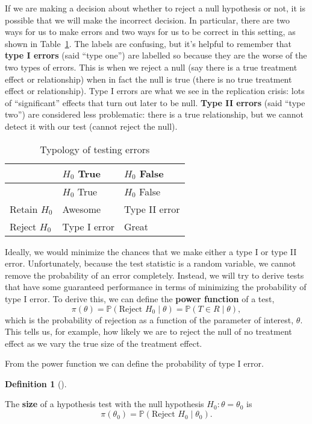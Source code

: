 \documentclass[
  letterpaper,
  DIV=11,
  numbers=noendperiod]{scrreprt}
\renewcommand{\P}{\mathbb{P}}
\theoremstyle{definition}
\newtheorem{definition}{Definition}[chapter]
\theoremstyle{plain}
\theoremstyle{definition}
\theoremstyle{remark}
\begin{document}
If we are making a decision about whether to reject a null hypothesis or
not, it is possible that we will make the incorrect decision. In
particular, there are two ways for us to make errors and two ways for us
to be correct in this setting, as shown in Table~\ref{tbl-errors}. The
labels are confusing, but it's helpful to remember that \textbf{type I
errors} (said ``type one'') are labelled so because they are the worse
of the two types of errors. This is when we reject a null (say there is
a true treatment effect or relationship) when in fact the null is true
(there is no true treatment effect or relationship). Type I errors are
what we see in the replication crisis: lots of ``significant'' effects
that turn out later to be null. \textbf{Type II errors} (said ``type
two'') are considered less problematic: there is a true relationship,
but we cannot detect it with our test (cannot reject the null).

\hypertarget{tbl-errors}{}
\begin{longtable}[]{@{}lll@{}}
\caption{\label{tbl-errors}Typology of testing errors}\tabularnewline
\toprule()
& \(H_0\) True & \(H_0\) False \\
\midrule()
\endfirsthead
\toprule()
& \(H_0\) True & \(H_0\) False \\
\midrule()
\endhead
Retain \(H_0\) & Awesome & Type II error \\
Reject \(H_0\) & Type I error & Great \\
\bottomrule()
\end{longtable}

Ideally, we would minimize the chances that we make either a type I or
type II error. Unfortunately, because the test statistic is a random
variable, we cannot remove the probability of an error completely.
Instead, we will try to derive tests that have some guaranteed
performance in terms of minimizing the probability of type I error. To
derive this, we can define the \textbf{power function} of a test, \[ 
\pi(\theta) = \P\left(  \text{Reject } H_0 \mid \theta \right) = \P\left( T \in R \mid \theta \right),
\] which is the probability of rejection as a function of the parameter
of interest, \(\theta\). This tells us, for example, how likely we are
to reject the null of no treatment effect as we vary the true size of
the treatment effect.

From the power function we can define the probability of type I error.

\leavevmode{}%
\begin{definition}[]\label{def-size}

The \textbf{size} of a hypothesis test with the null hypothesis
\(H_0: \theta = \theta_0\) is \[ 
\pi(\theta_0) = \P\left( \text{Reject } H_0 \mid \theta_0 \right).
\]

\end{definition}
\end{document}
